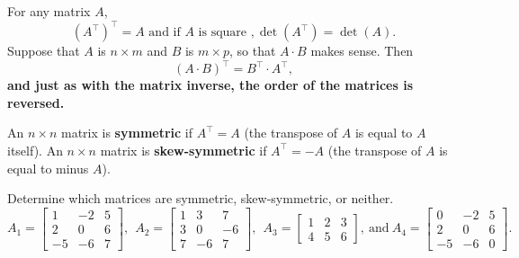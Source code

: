 \documentclass[letterpaper]{book}
\begin{document}
\begin{tcolorbox}[title=\textbf{\Large Properties of the Transpose Operation}]
For any matrix $A$, 
$$(A^\top)^\top = A \text{  and if }A \text{ is square }, \det(A^\top) = \det(A). $$
Suppose that $A$ is $n \times m$ and $B$ is $m \times p$, so that $A \cdot B$ makes sense. Then
$$ (A \cdot B)^\top = B^\top \cdot A^\top, $$
\textbf{and just as with the matrix inverse, the order of the matrices is reversed.}  \end{tcolorbox}

\begin{tcolorbox}[[sharp corners, colback=lightergray, colframe=red, title=\textbf{\Large  Symmetric and Skew-symmetric Matrices}] \Large 
An $n \times n$ matrix is \textbf{symmetric} if $A^\top = A$ (the transpose of $A$ is equal to $A$ itself). An $n \times n$ matrix is \textbf{skew-symmetric} if $A^\top = -A$ (the transpose of $A$ is equal to minus $A$). 
\end{tcolorbox}
\vspace*{0.2cm}

\begin{example}
Determine which matrices are symmetric, skew-symmetric, or neither.
$$
A_1=\left[
\begin{array}{rrr}
1 & -2 & 5\\
2 & 0 & 6\\
-5 & -6 & 7
\end{array} \right],~~A_2=\left[
\begin{array}{rrr}
1 & 3 & 7\\
3 & 0 & -6\\
7 & -6 & 7
\end{array} \right],~~
A_3=\left[
\begin{array}{ccc}
1 & 2 & 3\\
4 & 5 & 6
\end{array} \right], ~\text{and}~A_4=\left[
\begin{array}{rrr}
0& -2 & 5\\
2 & 0 & 6\\
-5 & -6 & 0
\end{array} \right].
$$
\end{example}
\end{document}
